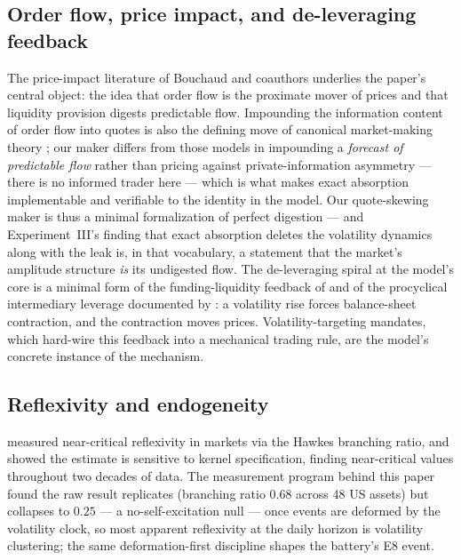 \documentclass[11pt]{article}
\begin{document}
\subsection{Order flow, price impact, and de-leveraging feedback}
\label{sec:related:flow}

The price-impact literature of Bouchaud and coauthors
\citep{bouchaud2009, bouchaud2018} underlies the paper's central object: the
idea that order flow is the proximate mover of prices and that liquidity
provision digests predictable flow. Impounding the information content of
order flow into quotes is also the defining move of canonical
market-making theory \citep{kyle1985, glosten1985}; our maker differs
from those models in impounding a \emph{forecast of predictable flow}
rather than pricing against private-information asymmetry --- there is
no informed trader here --- which is what makes exact absorption
implementable and verifiable to the identity in the model. Our
quote-skewing maker is thus a minimal
formalization of perfect digestion --- and Experiment~III's finding that exact
absorption deletes the volatility dynamics along with the leak is, in that
vocabulary, a statement that the market's amplitude structure \emph{is} its
undigested flow. The de-leveraging spiral at the model's core is a minimal
form of the funding-liquidity feedback of \citet{brunnermeier2009} and of
the procyclical intermediary leverage documented by \citet{adrian2010}: a
volatility rise forces balance-sheet contraction, and the contraction moves
prices. Volatility-targeting mandates, which hard-wire this feedback into a
mechanical trading rule, are the model's concrete instance of the
mechanism.

\subsection{Reflexivity and endogeneity}
\label{sec:related:reflex}

\citet{filimonov2012} measured near-critical reflexivity in
markets via
the Hawkes branching ratio, and \citet{hardiman2013} showed the estimate is
sensitive to kernel specification, finding near-critical values throughout
two decades of data. The measurement program behind this paper found
the raw result replicates (branching ratio $0.68$ across 48 US assets) but
collapses to $0.25$ --- a no-self-excitation null --- once events are deformed
by the volatility clock, so most apparent reflexivity at the daily horizon is
volatility clustering; the same deformation-first discipline shapes the
battery's E8 event.
\end{document}
